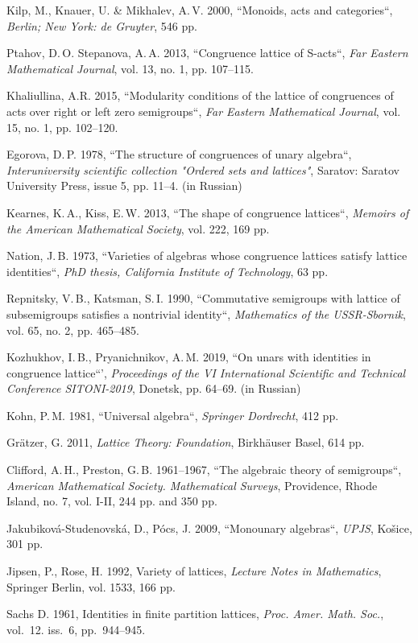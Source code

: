 \documentclass[11pt,twoside,final
]{article}
\begin{document}
\begin{engbibliography}{99}

	Kilp, M., Knauer, U. \& Mikhalev, A.\,V. 2000, ``Monoids, acts and categories``, \textit{Berlin; New York: de Gruyter}, 546 pp.

	Ptahov, D.\,O. Stepanova, A.\,A. 2013, ``Congruence lattice of S-acts``, \textit{Far Eastern Mathematical Journal}, vol. 13, no. 1, pp. 107--115.

	Khaliullina, A.R. 2015, ``Modularity conditions of the lattice of congruences of acts over right or left zero semigroups``, \textit{Far Eastern Mathematical Journal}, vol. 15, no. 1, pp. 102--120.

	Egorova, D.\,P. 1978, ``The structure of congruences of unary algebra``, \textit{Interuniversity scientific collection "Ordered sets and lattices"}, Saratov: Saratov University Press, issue 5, pp. 11--4. (in Russian)

	Kearnes, K.\,A., Kiss, E.\,W. 2013, ``The shape of congruence lattices``, \textit{Memoirs of the American Mathematical Society}, vol. 222, 169 pp.

	Nation, J.\,B. 1973, ``Varieties of algebras whose congruence lattices satisfy lattice identities``, \textit{PhD thesis, California Institute of Technology}, 63 pp.

	Repnitsky, V.\,B., Katsman, S.\,I. 1990, ``Commutative semigroups with lattice of subsemigroups satisfies a nontrivial identity``, \textit{Mathematics of the USSR-Sbornik}, vol. 65, no. 2, pp. 465--485.

	Kozhukhov, I.\,B., Pryanichnikov, A.\,M. 2019, ``On unars with identities in congruence lattice``', \textit{Proceedings of the VI International Scientific and Technical Conference SITONI-2019}, Donetsk, pp. 64--69. (in Russian)

	Kohn, P.\,M. 1981, ``Universal algebra``, \textit{Springer Dordrecht}, 412 pp.

	Grätzer, G. 2011, \textit{Lattice Theory: Foundation}, Birkhäuser Basel, 614 pp.

	Clifford, A.\,H., Preston, G.\,B. 1961--1967, ``The algebraic theory of semigroups``, \textit{American Mathematical Society. Mathematical Surveys}, Providence, Rhode Island, no. 7, vol. I-II, 244 pp. and 350 pp.

	Jakubiková-Studenovská, D., Pócs, J. 2009, ``Monounary algebras``, \textit{UPJS}, Košice, 301 pp.

	Jipsen, P., Rose, H. 1992, Variety of lattices, \textit{Lecture Notes in Mathematics}, Springer Berlin, vol. 1533, 166 pp.

	Sachs D. 1961, Identities in finite partition lattices, \textit{Proc. Amer. Math. Soc.}, vol.~12. iss.~6, pp.~944--945.

\end{engbibliography}

\label{end}
\end{document}
